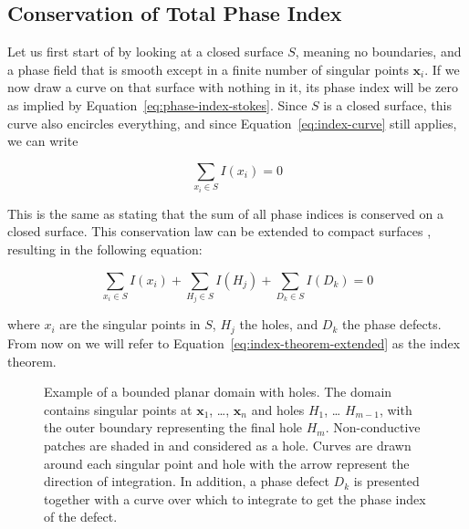 \documentclass[twocolumn]{article}
\begin{document}
\subsection{Conservation of Total Phase Index}

Let us first start of by looking at a closed surface $S$, meaning no boundaries,
and a phase field that is smooth except in a finite number of singular points $\bm{x}_i$.
If we now draw a curve on that surface with nothing in it,
its phase index will be zero as implied by Equation~\ref{eq:phase-index-stokes}.
Since \(S\) is a closed surface, this curve also encircles everything,
and since Equation~\ref{eq:index-curve} still applies,
we can write

\begin{equation}
  \sum_{x_i \in S} I(x_i) = 0
  \label{eq:index-theorem}
\end{equation}

\noindent This is the same as stating that the sum of all phase indices is
conserved on a closed surface.
This conservation law can be extended to compact surfaces \autocite{herlin2012reconstruction, davidsen2004topological},
resulting in the following equation:

\begin{equation}
  \sum_{x_i \in S} I(x_i) + \sum_{H_j \in S} I(H_j) + \sum_{D_k \in S} I(D_k)  = 0
  \label{eq:index-theorem-extended}
\end{equation}

\noindent where \(x_i\) are the singular points in \(S\),
\(H_j\) the holes,
and \(D_k\) the phase defects.
From now on we will refer to Equation~\ref{eq:index-theorem-extended} as the index theorem.

\begin{figure}[ht]
  \centering
  \caption{Example of a bounded planar domain with holes. The domain
    contains singular points at \(\pmb{x}_1\), \ldots, \(\pmb{x}_n\) and
    holes \(H_1\), \ldots{} \(H_{m-1}\), with the outer boundary
    representing the final hole \(H_m\).
    Non-conductive patches are shaded in and considered as a hole.
    Curves are drawn around each singular point and hole
    with the arrow represent the direction of integration.
    In addition, a phase defect $D_k$ is presented
    together with a curve over which to integrate to get the phase index of the defect.
  }
  \label{fig:index_calculation}
\end{figure}

\vspace{2em}
\end{document}
